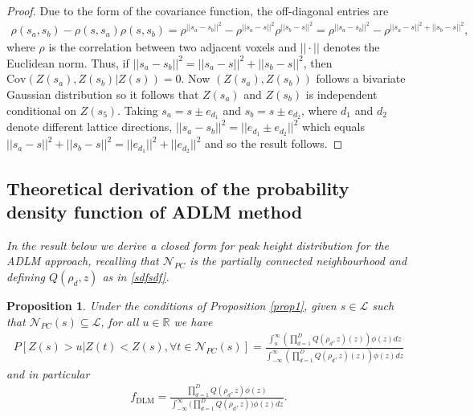 \documentclass{article}
\newtheorem{Proposition}[theorem]{Proposition}
\newcommand{\Cov}{\mathrm{Cov}}
\newcommand{\nt}[1]{\textit{\color{red} #1}}
\begin{document}
\begin{proof}
Due to the form of the covariance function, the off-diagonal entries are 
\begin{align*}
    \rho(s_a, s_b) - \rho(s, s_a)\rho(s, s_b) = \rho^{||s_a-s_b||^2} - \rho^{||s_a-s||^2}\rho^{||s_b-s||^2} = \rho^{||s_a-s_b||^2} - \rho^{||s_a-s||^2 + ||s_b-s||^2},
\end{align*}
where $\rho$ is the correlation between two adjacent voxels and $||\cdot||$ denotes the Euclidean norm. Thus, if $||s_a-s_b||^2 = ||s_a-s||^2 + ||s_b-s||^2$, then $\Cov(Z(s_a), Z(s_b)|Z(s)) = 0$. Now $(Z(s_a), Z(s_b))$ follows a bivariate Gaussian distribution so it follows that $Z(s_a)$ and $Z(s_b)$ is independent conditional on $Z(s_5)$. Taking $s_a = s\pm e_{d_1}$ and $s_b = s\pm e_{d_2}$, where $d_1$ and $d_2$ denote different lattice directions, $||s_a-s_b||^2 = ||e_{d_1} \pm e_{d_2}||^2$ which equals $||s_a-s||^2 + ||s_b-s||^2 = ||e_{d_1}||^2 + ||e_{d_2}||^2$ and so the result follows. 
\end{proof}

\subsection{Theoretical derivation of the probability density function of ADLM method\label{appendix.a2}}
\nt{In the result below we derive a closed form for peak height distribution for the ADLM approach, recalling that $\mathcal{N}_{PC}$ is the partially connected neighbourhood and defining $Q(\rho_d,z)$ as in \eqref{sdfsdf}.}
\begin{Proposition}\label{prop2}
\nt{Under the conditions of Proposition \ref{prop1}, given $s \in \mathcal{L}$ such that $\mathcal{N}_{PC}(s) \subseteq \mathcal{L}$, for all $u \in \mathbb{R}$ we have}
\begin{align*}
    P [Z(s) > u|Z(t) < Z(s), \forall t \in \mathcal{N}_{PC}(s)] = \frac{\int_u^\infty\left(\prod_{d=1}^DQ(\rho_d,z)(z)\right)\phi(z)dz}{\int_{-\infty}^\infty\left(\prod_{d=1}^DQ(\rho_d,z)(z)\right)\phi(z)dz}
\end{align*}
\nt{and in particular
\begin{align*}
	f_{\text{DLM}} = \frac{\prod_{d=1}^DQ(\rho_d,z)\phi(z)}{\int_{-\infty}^\infty\bigg(\prod_{d=1}^DQ(\rho_d,z)\bigg)\phi(z)dz}.
\end{align*}}
\end{Proposition}
\end{document}
